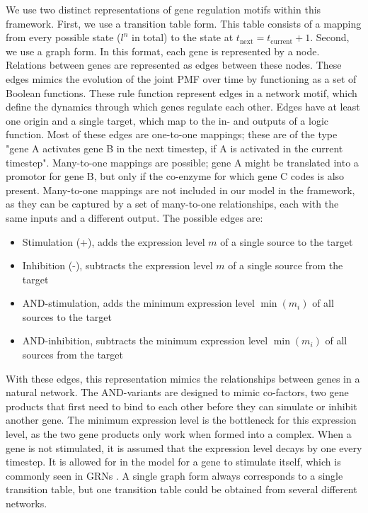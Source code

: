 \documentclass[../main.tex]{subfiles}
\begin{document}
We use two distinct representations of gene regulation motifs within this framework.
First, we use a transition table form.
This table consists of a mapping from every possible state ($l^n$ in total) to the state at $t_\mathrm{next} = t_\mathrm{current} + 1$.
Second, we use a graph form.
In this format, each gene is represented by a node.
Relations between genes are represented as edges between these nodes.
These edges mimics the evolution of the joint PMF over time by functioning as a set of Boolean functions.
These rule function represent edges in a network motif, which define the dynamics through which genes regulate each other.
Edges have at least one origin and a single target, which map to the in- and outputs of a logic function.
Most of these edges are one-to-one mappings; these are of the type "gene A activates gene B in the next timestep, if A is activated in the current timestep".
Many-to-one mappings are possible; gene A might be translated into a promotor for gene B, but only if the co-enzyme for which gene C codes is also present.
Many-to-one mappings are not included in our model in the framework, as they can be captured by a set of many-to-one relationships, each with the same inputs and a different output.
The possible edges are:
%
\begin{itemize}
\item Stimulation (+), adds the expression level $m$ of a single source to the target
\item Inhibition (-), subtracts the expression level $m$ of a single source from the target
\item AND-stimulation, adds the minimum expression level $\min(m_i)$ of all sources to the target
\item AND-inhibition, subtracts the minimum expression level $\min(m_i)$ of all sources from the target
\end{itemize}
%
With these edges, this representation mimics the relationships between genes in a natural network.
The AND-variants are designed to mimic co-factors, two gene products that first need to bind to each other before they can simulate or inhibit another gene.
The minimum expression level is the bottleneck for this expression level, as the two gene products only work when formed into a complex.
When a gene is not stimulated, it is assumed that the expression level decays by one every timestep.
It is allowed for in the model for a gene to stimulate itself, which is commonly seen in GRNs \cite{}.
A single graph form always corresponds to a single transition table, but one transition table could be obtained from several different networks.
\end{document}
